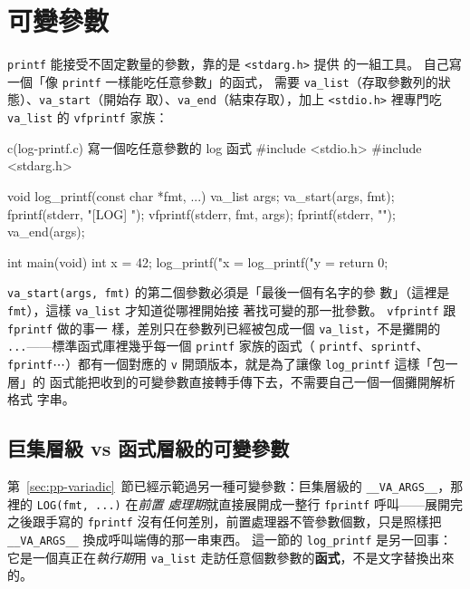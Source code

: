 \section{可變參數}
\label{sec:sl-variadic}

\texttt{printf} 能接受不固定數量的參數，靠的是 \texttt{<stdarg.h>} 提供
的一組工具。 自己寫一個「像 \texttt{printf} 一樣能吃任意參數」的函式，
需要 \texttt{va\_list}（存取參數列的狀態）、\texttt{va\_start}（開始存
取）、\texttt{va\_end}（結束存取），加上 \texttt{<stdio.h>} 裡專門吃
\texttt{va\_list} 的 \texttt{vfprintf} 家族：

\begin{example}{c}{(log-printf.c) 寫一個吃任意參數的 log 函式}
#include <stdio.h>
#include <stdarg.h>

void log_printf(const char *fmt, ...) {
    va_list args;
    va_start(args, fmt);
    fprintf(stderr, "[LOG] ");
    vfprintf(stderr, fmt, args);
    fprintf(stderr, "\n");
    va_end(args);
}

int main(void) {
    int x = 42;
    log_printf("x = %
    log_printf("y = %
    return 0;
}
\end{example}


\texttt{va\_start(args, fmt)} 的第二個參數必須是「最後一個有名字的參
數」（這裡是 \texttt{fmt}），這樣 \texttt{va\_list} 才知道從哪裡開始接
著找可變的那一批參數。 \texttt{vfprintf} 跟 \texttt{fprintf} 做的事一
樣，差別只在參數列已經被包成一個 \texttt{va\_list}，不是攤開的
\texttt{...}——標準函式庫裡幾乎每一個 \texttt{printf} 家族的函式（
\texttt{printf}、\texttt{sprintf}、\texttt{fprintf}⋯）都有一個對應的
\texttt{v} 開頭版本，就是為了讓像 \texttt{log\_printf} 這樣「包一層」的
函式能把收到的可變參數直接轉手傳下去，不需要自己一個一個攤開解析格式
字串。

\subsection{巨集層級 vs 函式層級的可變參數}

第~\ref{sec:pp-variadic}~節已經示範過另一種可變參數：巨集層級的
\texttt{\_\_VA\_ARGS\_\_}，那裡的 \texttt{LOG(fmt, ...)} 在\textit{前置
處理期}就直接展開成一整行 \texttt{fprintf} 呼叫——展開完之後跟手寫的
\texttt{fprintf} 沒有任何差別，前置處理器不管參數個數，只是照樣把
\texttt{\_\_VA\_ARGS\_\_} 換成呼叫端傳的那一串東西。 這一節的
\texttt{log\_printf} 是另一回事：它是一個真正在\textit{執行期}用
\texttt{va\_list} 走訪任意個數參數的\textbf{函式}，不是文字替換出來
的。

